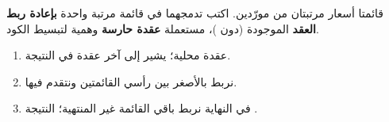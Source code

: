 \begin{statement}
قائمتا أسعار مرتبتان من مورّدين. اكتب  تدمجهما في قائمة مرتبة واحدة \textbf{بإعادة ربط العقد} الموجودة (دون )، مستعملة \textbf{عقدة حارسة} وهمية لتبسيط الكود.
\end{statement}
\begin{stepsbox}\begin{enumerate}
\item {} عقدة محلية؛  يشير إلى آخر عقدة في النتيجة.
\item نربط  بالأصغر بين رأسي القائمتين ونتقدم فيها.
\item في النهاية نربط باقي القائمة غير المنتهية؛ النتيجة .
\end{enumerate}\end{stepsbox}

